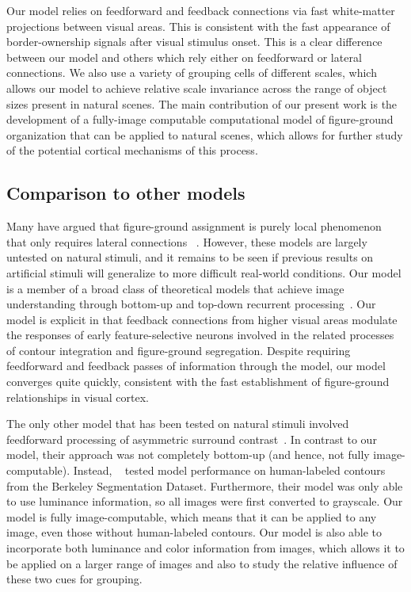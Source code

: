 \documentclass[12pt]{article}
\begin{document}
Our model relies on feedforward and feedback connections via fast white-matter projections between visual areas. This is consistent with the fast appearance of border-ownership signals after visual stimulus onset. This is a clear difference between our model and others which rely either on feedforward or lateral connections. We also use a variety of grouping cells of different scales, which allows our model to achieve relative scale invariance across the range of object sizes present in natural scenes. The main contribution of our present work is the development of a fully-image computable computational model of figure-ground organization that can be applied to natural scenes, which allows for further study of the potential cortical mechanisms of this process.

%
\subsection{Comparison to other models}
Many have argued that figure-ground assignment is purely local phenomenon
that only requires lateral connections
~\citep{Grossberg94, Grossberg97, Zhaoping05}. However, these models are largely untested on natural stimuli, and it remains to be seen if previous results on artificial stimuli will generalize to more difficult real-world conditions.
Our model is a member of a broad class of theoretical models that
achieve image understanding through bottom-up and top-down recurrent
processing~\citep{Ullman84,Hochstein_Ahissar02,Roelfsema_06,Epshtein_etal08}.
Our model is explicit in that feedback connections from higher visual areas
modulate the responses of early feature-selective neurons involved in
the related processes of contour integration and figure-ground
segregation. Despite requiring feedforward and feedback passes of information through
the model, our model converges quite quickly, consistent with the fast establishment of figure-ground relationships in visual cortex. 
%

The only other model that has been tested on natural stimuli involved feedforward processing of asymmetric surround contrast~\citep{Nishimura_Sakai05,Sakai_etal12}.
In contrast to our model, their approach was not completely bottom-up (and hence, not fully image-computable). Instead, ~\citet{Sakai_etal12} tested model performance on human-labeled contours from the Berkeley Segmentation Dataset. Furthermore, their model was only able to use luminance information, so all images were first converted to grayscale. Our model is fully image-computable, which  means that it can be applied to any image, even those without human-labeled contours. Our model is also able to incorporate both luminance and color information from images, which allows it to be applied on a larger range of images and also to study the relative influence of these two cues for grouping.
\end{document}
